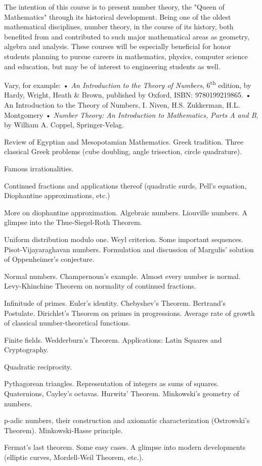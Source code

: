 \documentclass{osucourse}
\begin{document}
\CatalogDescription
\PrerequisitesAndExclusions

\begin{Purpose}
The intention of this course is to present number theory, the "Queen of Mathematics" through its historical development. Being one of the oldest mathematical disciplines, number theory, in the course of its history, both benefited from and contributed to such major mathematical areas as geometry, algebra and analysis. These courses will be especially beneficial for honor students planning to pursue careers in mathematics, physics, computer science and education, but may be of interest to engineering students as well.
\end{Purpose}

\begin{Text}
Vary, for example: • \emph{An Introduction to the Theory of Numbers}, 6\textsuperscript{th} edition, by Hardy, Wright, Heath \& Brown, published by Oxford, ISBN: 9780199219865. • An Introduction to the Theory of Numbers, I. Niven, H.S. Zukkerman, H.L. Montgomery • \emph{Number Theory: An Introduction to Mathematics, Parts A and B}, by William A. Coppel, Springer-Velag.
\end{Text}

\begin{TopicsList}
\item Review of Egyptian and Mesopotamian Mathematics. Greek tradition. Three classical Greek problems (cube doubling, angle trisection, circle quadrature).
\item Famous irrationalities.
\item Continued fractions and applications thereof (quadratic surds, Pell’s equation, Diophantine approximations, etc.)
\item More on diophantine approximation. Algebraic numbers. Liouville numbers. A glimpse into the Thue-Siegel-Roth Theorem.
\item Uniform distribution modulo one. Weyl criterion. Some important sequences. Pisot-Vijayaraghavan numbers. Formulation and discussion of Margulis’ solution of Oppenheimer’s conjecture.
\item Normal numbers. Champernoun’s example. Almost every number is normal. Levy-Khinchine Theorem on normality of continued fractions.
\item Infinitude of primes. Euler’s identity. Chebyshev’s Theorem. Bertrand’s Postulate. Dirichlet’s Theorem on primes in progressions. Average rate of growth of classical number-theoretical functions.
\item Finite fields. Wedderburn’s Theorem. Applications: Latin Squares and Cryptography.
\item Quadratic reciprocity.
\item Pythagorean triangles. Representation of integers as sums of squares. Quaternions, Cayley’s octavas. Hurwitz’ Theorem. Minkowski’s geometry of numbers.
\item p-adic numbers, their construction and axiomatic characterization (Ostrowski’s Theorem). Minkowski-Hasse principle.
\item Fermat’s last theorem. Some easy cases. A glimpse into modern developments (elliptic curves, Mordell-Weil Theorem, etc.).
\end{TopicsList}
\end{document}
